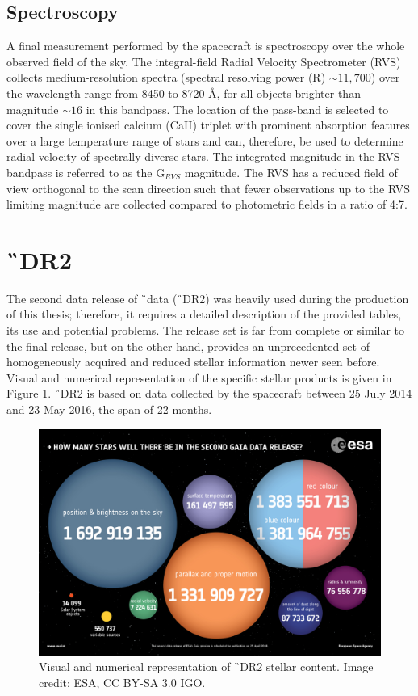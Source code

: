 \subsection{Spectroscopy}
A final measurement performed by the spacecraft is spectroscopy over the whole observed field of the sky. The integral-field Radial Velocity Spectrometer (RVS) \cite{2018A&A...616A...5C} collects medium-resolution spectra (spectral resolving power (R) $\sim11,700$) over the wavelength range from 8450 to 8720 \AA, for all objects brighter than magnitude $\sim16$ in this bandpass. The location of the pass-band is selected to cover the single ionised calcium (CaII) triplet with prominent absorption features over a large temperature range of stars and can, therefore, be used to determine radial velocity of spectrally diverse stars. The integrated magnitude in the RVS bandpass is referred to as the G$_{RVS}$ magnitude. The RVS has a reduced field of view orthogonal to the scan direction such that fewer observations up to the RVS limiting magnitude are collected compared to photometric fields in a ratio of 4:7.

\section{\G\ DR2}
\label{sec:gaia_dr2_data}
The second data release of \G\ data (\G\ DR2) was heavily used during the production of this thesis; therefore, it requires a detailed description of the provided tables, its use and potential problems. The release set is far from complete or similar to the final release, but on the other hand, provides an unprecedented set of homogeneously acquired and reduced stellar information newer seen before. Visual and numerical representation of the specific stellar products is given in Figure \ref{fig:gaia_drs}. \G\ DR2 is based on data collected by the spacecraft between 25 July 2014 and 23 May 2016, the span of 22 months.

\begin{figure}
	\centering
	\includegraphics[width=\columnwidth]{1567214817936-Gaia_DR2_numbers_1280.jpg}
	\caption{Visual and numerical representation of \G\ DR2 stellar content. Image credit: ESA, CC BY-SA 3.0 IGO.}
	\label{fig:gaia_drs}
\end{figure}

